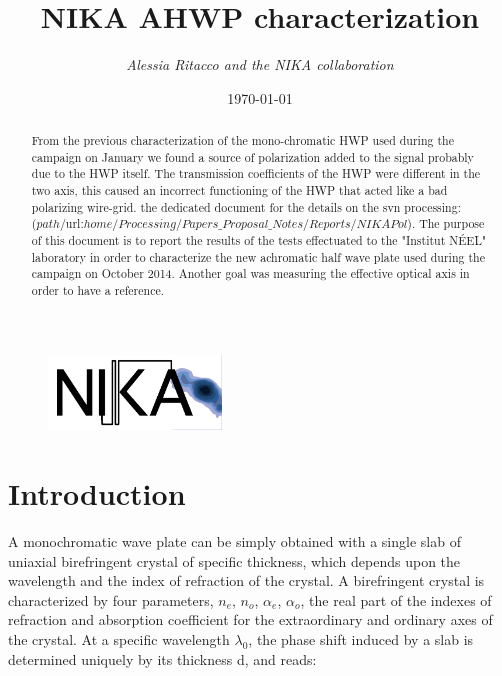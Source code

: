 \documentclass[a4paper,10pt]{article}
\title{\bf NIKA AHWP characterization}           %
\author{{\it Alessia Ritacco and the NIKA collaboration}}
\date{\today}
\begin{document}
\maketitle                    
                              
\begin{figure}[!h]
\centering
\includegraphics[height=2cm,trim=0cm 0.1cm 0.1cm 0.1cm, clip=true]{figures/nika_white_bg}
\end{figure}
\vspace*{0.5cm}

\setcounter{page}{1}
\setcounter{tocdepth}{1}

\begin{abstract}
	From the previous characterization of the mono-chromatic HWP used during the campaign on January we found a source of polarization added to the signal probably due to the HWP itself. The transmission coefficients of the HWP were different in the two axis, this caused an incorrect functioning of the HWP that acted like a bad polarizing wire-grid.  the dedicated document for the details on the svn processing: \\($path$/url:{$home/Processing/Papers\_Proposal\_Notes/Reports/NIKAPol$}).
	The purpose of this document is to report the results of the tests effectuated to the "Institut NÉEL" laboratory in order to characterize the new achromatic half wave plate used during the campaign on October 2014.
	Another goal was measuring the effective optical axis in order to have a reference.
\end{abstract}

\section{Introduction}
A monochromatic wave plate can be simply obtained with a single slab of uniaxial birefringent crystal of specific thickness, which depends upon the wavelength and the index of refraction of the crystal. 
A birefringent crystal is characterized by four parameters, {$n_e$}, {$n_o$}, {$\alpha_e$}, {$\alpha_o$}, the real part of the indexes of refraction and absorption coefficient for the extraordinary and ordinary axes of the crystal.
At a specific wavelength {$\lambda_0$}, the phase shift induced by a slab is determined uniquely by its thickness d, and reads:
	
\end{document}
